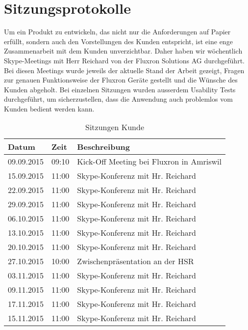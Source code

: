 \section{Sitzungsprotokolle}
\label{Sitzungsprotokolle}

Um ein Produkt zu entwickeln, das nicht nur die Anforderungen auf Papier erfüllt, sondern auch den Vorstellungen des Kunden entspricht, ist eine enge Zusammenarbeit mit dem Kunden unverzichtbar. Daher haben wir wöchentlich Skype-Meetings mit Herr Reichard von der Fluxron Solutions AG durchgeführt. Bei diesen Meetings wurde jeweils der aktuelle Stand der Arbeit gezeigt, Fragen zur genauen Funktionsweise der Fluxron Geräte gestellt und die Wünsche des Kunden abgeholt. Bei einzelnen Sitzungen wurden ausserdem Usability Tests durchgeführt, um sicherzustellen, dass die Anwendung auch problemlos vom Kunden bedient werden kann.

\begin{table}[H]
\begin{tabularx}{\textwidth}{ l | l | X}
\textbf{Datum}& \textbf{Zeit} & \textbf{Beschreibung}\\ \hline
09.09.2015 & 09:10 & Kick-Off Meeting bei Fluxron in Amriswil\\ \hline
15.09.2015 & 11:00 & Skype-Konferenz mit Hr. Reichard\\ \hline
22.09.2015 & 11:00 & Skype-Konferenz mit Hr. Reichard\\ \hline
29.09.2015 & 11:00 & Skype-Konferenz mit Hr. Reichard\\ \hline
06.10.2015 & 11:00 & Skype-Konferenz mit Hr. Reichard\\ \hline
13.10.2015 & 11:00 & Skype-Konferenz mit Hr. Reichard\\ \hline
20.10.2015 & 11:00 & Skype-Konferenz mit Hr. Reichard\\ \hline
27.10.2015 & 10:00 & Zwischenpräsentation an der \ac{HSR}\\ \hline
03.11.2015 & 11:00 & Skype-Konferenz mit Hr. Reichard\\ \hline
09.11.2015 & 11:00 & Skype-Konferenz mit Hr. Reichard\\ \hline
17.11.2015 & 11:00 & Skype-Konferenz mit Hr. Reichard\\ \hline
15.11.2015 & 11:00 & Skype-Konferenz mit Hr. Reichard\\
\end{tabularx}
\caption{Sitzungen Kunde}
\end{table}


